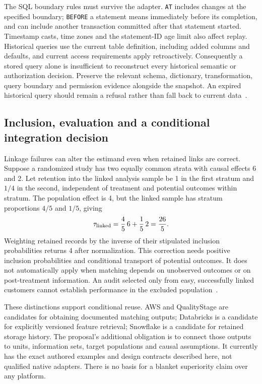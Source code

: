 The SQL boundary rules must survive the adapter. \texttt{AT} includes changes at
the specified boundary; \texttt{BEFORE} a statement means immediately before its
completion, and can include another transaction committed after that statement
started. Timestamp casts, time zones and the statement-ID age limit also affect
replay. Historical queries use the current table definition, including added
columns and defaults, and current access requirements apply retroactively.
Consequently a stored query alone is insufficient to reconstruct every historical
semantic or authorization decision. Preserve the relevant schema, dictionary,
transformation, query boundary and permission evidence alongside the snapshot.
An expired historical query should remain a refusal rather than fall back to
current data~\citep{exec22_obs_snowflake_at}.

\subsection{Inclusion, evaluation and a conditional integration decision}
\label{exec22:obs-selection}

Linkage failures can alter the estimand even when retained links are correct.
Suppose a randomized study has two equally common strata with causal effects 6
and 2. Let retention into the linked analysis sample be 1 in the first stratum
and $1/4$ in the second, independent of treatment and potential outcomes within
stratum. The population effect is 4, but the linked sample has stratum proportions
$4/5$ and $1/5$, giving
\begin{equation}
 \tau_{\rm linked}=\frac45\,6+\frac15\,2=\frac{26}{5}.
 \label{exec22:obs-inclusion}
\end{equation}
Weighting retained records by the inverse of their stipulated inclusion
probabilities returns 4 after normalization. This correction needs positive
inclusion probabilities and conditional transport of potential outcomes. It does
not automatically apply when matching depends on unobserved outcomes or on
post-treatment information. An audit selected only from easy, successfully linked
customers cannot establish performance in the excluded population~\citep{exec22_obs_reference}.

These distinctions support conditional reuse. AWS and QualityStage are candidates
for obtaining documented matching outputs; Databricks is a candidate for explicitly
versioned feature retrieval; Snowflake is a candidate for retained storage history.
The proposal's additional obligation is to connect those outputs to units,
information sets, target populations and causal assumptions. It currently has the
exact authored examples and design contracts described here, not qualified native
adapters. There is no basis for a blanket superiority claim over any platform.

